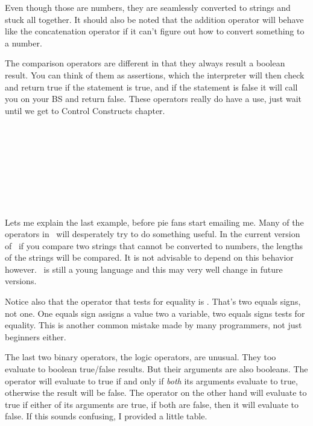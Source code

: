 Even though those are numbers, they are seamlessly converted to strings and stuck all together.  It should also be noted that the addition operator \SSCode{+} will behave like the concatenation operator if it can't figure out how to convert something to a number.

The comparison operators are different in that they always result a boolean result.  You can think of them as assertions, which the interpreter will then check and return true if the statement is true, and if the statement is false it will call you on your BS and return false.  These operators really do have a use, just wait until we get to Control Constructs chapter.

\begin{SSCodeBox}
\scitea{ }
\scitea{ == }
\scitea{;} \\
\scitea{} \\
\scitea{} \\
\scitea{ }
\scitea{ $>$ }
\scitea{;} \\
\scitea{} \\
\scitea{} \\
\scitea{ }
\scitea{ $>$ }
\scitea{;} \\
\end{SSCodeBox}

Lets me explain the last example, before pie fans start emailing me.  Many of the operators in \SSquared\ will desperately try to do something useful.  In the current version of \SSquared\ if you compare two strings that cannot be converted to numbers, the lengths of the strings will be compared.  It is not advisable to depend on this behavior however.  \SSquared\ is still a young language and this may very well change in future versions.

Notice also that the operator that tests for equality is \SSCode{==}.  That's two equals signs, not one.  One equals sign assigns a value two a variable, two equals signs tests for equality.  This is another common mistake made by many programmers, not just beginners either.

The last two binary operators, the logic operators, are unusual.  They too evaluate to boolean true/false results. But their arguments are also booleans.  The  operator will evaluate to true if and only if \emph{both} its arguments evaluate to true, otherwise the result will be false.  The  operator on the other hand will evaluate to true if either of its arguments are true, if both are false, then it will evaluate to false.  If this sounds confusing, I provided a little table.

